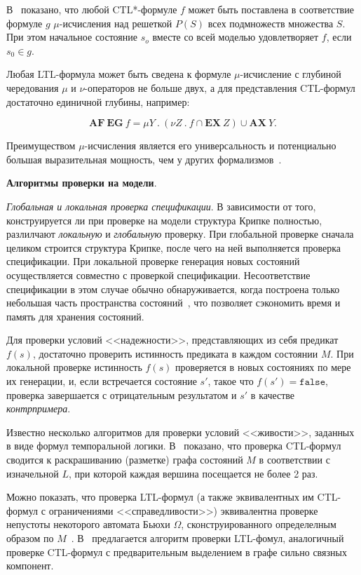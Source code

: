 \documentclass[a4paper,notitlepage,14pt]{article}
\begin{document}
В~\cite{Emerson97modelchecking} показано, что любой CTL*-формуле $f$ может быть поставлена
в соответствие формуле $g$ $\mu$-исчисления над решеткой $P(S)$ всех подмножеств множества
$S$. При этом начальное состояние $s_o$ вместе со всей моделью удовлетворяет $f$, если
$s_0 \in g$.

Любая LTL-формула может быть сведена к формуле $\mu$-исчисление с глубиной чередования
$\mu$ и $\nu$-операторов не больше двух, а для представления CTL-формул достаточно
единичной глубины, например:

$$\mathbf{AF~EG}~f = \mu Y~.~(\nu Z~.~f \cap \mathbf{EX}~Z) \cup \mathbf{AX}~Y.$$

Преимуществом $\mu$-исчисления является его универсальность и потенциально большая
выразительная мощность, чем у других формализмов~\cite{Emerson97modelchecking}.

\textbf{Алгоритмы проверки на модели}.

\textit{Глобальная и локальная проверка спецификации}. В зависимости от того,
конструируется ли при проверке на модели структура Крипке полностью, разлилчают
\emph{локальную} и \emph{глобальную} проверку. При глобальной проверке сначала целиком
строится структура Крипке, после чего на ней выполняется проверка спецификации. При
локальной проверке генерация новых состояний осуществляется совместно с проверкой
спецификации. Несоответствие спецификации в этом случае обычно обнаруживается, когда
построена только небольшая часть пространства состояний~\cite{Clarke}, что позволяет
сэкономить время и память для хранения состояний.

Для проверки условий <<надежности>>, представляющих из себя предикат $f(s)$, достаточно
проверить истинность предиката в каждом состоянии $M$. При локальной проверке истинность
$f(s)$ проверяется в новых состояниях по мере их генерации, и, если встречается состояние
$s'$, такое что $f(s') = \mathtt{false}$, проверка завершается с отрицательным результатом
и $s'$ в качестве \emph{контрпримера}.

Известно несколько алгоритмов для проверки условий <<живости>>, заданных в виде формул
темпоральной логики. В~\cite{Bhat95efficienton-the-fly} показано, что проверка CTL-формул
сводится к раскрашиванию (разметке) графа состояний $M$ в соответствии с изначельной $L$,
при которой каждая вершина посещается не более 2 раз.

Можно показать, что проверка LTL-формул (а также эквивалентных им CTL-формул с
ограничениями <<справедливости>>) эквивалентна проверке непустоты некоторого автомата
Бьюхи $\Omega$, сконструированного определелным образом по
$M$~\cite{Katoen}. В~\cite{Clarke97anotherlook} предлагается алгоритм проверки LTL-фомул,
аналогичный проверке CTL-формул с предварительным выделением в графе сильно связных
компонент.
\end{document}
